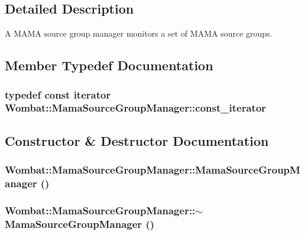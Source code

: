 \subsection{Detailed Description}
A MAMA source group manager monitors a set of MAMA source groups. 

\subsection{Member Typedef Documentation}
\hypertarget{classWombat_1_1MamaSourceGroupManager_afa14fa7a340c9d5a934cd13ff0de44db}{
\subsubsection[{const\_\-iterator}]{\setlength{\rightskip}{0pt plus 5cm}typedef const {\bf iterator} {\bf Wombat::MamaSourceGroupManager::const\_\-iterator}}}
\label{classWombat_1_1MamaSourceGroupManager_afa14fa7a340c9d5a934cd13ff0de44db}


\subsection{Constructor \& Destructor Documentation}
\hypertarget{classWombat_1_1MamaSourceGroupManager_a840c13d71d82d59de0b030f191fb87e4}{
\subsubsection[{MamaSourceGroupManager}]{\setlength{\rightskip}{0pt plus 5cm}Wombat::MamaSourceGroupManager::MamaSourceGroupManager ()}}
\label{classWombat_1_1MamaSourceGroupManager_a840c13d71d82d59de0b030f191fb87e4}
\hypertarget{classWombat_1_1MamaSourceGroupManager_af0be50dfe7f6f7a81d1e98a0e8351d56}{
\subsubsection[{$\sim$MamaSourceGroupManager}]{\setlength{\rightskip}{0pt plus 5cm}Wombat::MamaSourceGroupManager::$\sim$MamaSourceGroupManager ()}}
\label{classWombat_1_1MamaSourceGroupManager_af0be50dfe7f6f7a81d1e98a0e8351d56}


